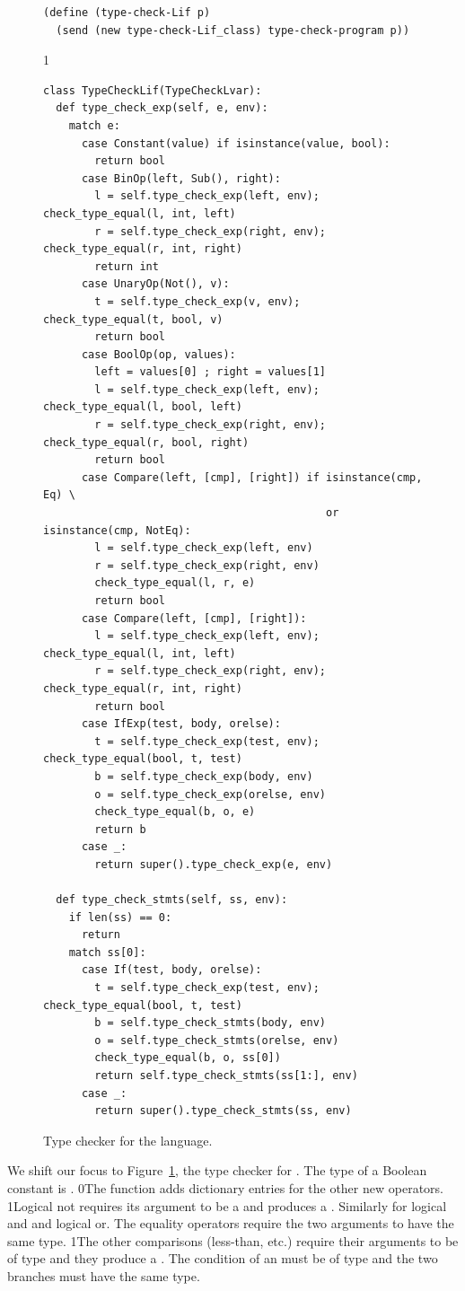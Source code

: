 \documentclass[7x10,nocrop]{TimesAPriori_MIT}%
\def\racketEd{0}
\def\pythonEd{1}
\def\edition{1}
\newcommand{\racket}[1]{{\if\edition\racketEd{#1}\fi}}
\newcommand{\python}[1]{{\if\edition\pythonEd #1\fi}}
\begin{document}
\begin{figure}[tbp]
{\begin{lstlisting}[basicstyle=\ttfamily\footnotesize]
(define (type-check-Lif p)
  (send (new type-check-Lif_class) type-check-program p))
\end{lstlisting}
\fi}
{\if\edition\pythonEd
\begin{lstlisting}
class TypeCheckLif(TypeCheckLvar):
  def type_check_exp(self, e, env):
    match e:
      case Constant(value) if isinstance(value, bool):
        return bool
      case BinOp(left, Sub(), right):
        l = self.type_check_exp(left, env); check_type_equal(l, int, left)
        r = self.type_check_exp(right, env); check_type_equal(r, int, right)
        return int
      case UnaryOp(Not(), v):
        t = self.type_check_exp(v, env); check_type_equal(t, bool, v)
        return bool 
      case BoolOp(op, values):
        left = values[0] ; right = values[1]
        l = self.type_check_exp(left, env); check_type_equal(l, bool, left)
        r = self.type_check_exp(right, env); check_type_equal(r, bool, right)
        return bool
      case Compare(left, [cmp], [right]) if isinstance(cmp, Eq) \
                                            or isinstance(cmp, NotEq):
        l = self.type_check_exp(left, env)
        r = self.type_check_exp(right, env)
        check_type_equal(l, r, e)
        return bool
      case Compare(left, [cmp], [right]):
        l = self.type_check_exp(left, env); check_type_equal(l, int, left)
        r = self.type_check_exp(right, env); check_type_equal(r, int, right)
        return bool
      case IfExp(test, body, orelse):
        t = self.type_check_exp(test, env); check_type_equal(bool, t, test)
        b = self.type_check_exp(body, env)
        o = self.type_check_exp(orelse, env)
        check_type_equal(b, o, e)
        return b
      case _:
        return super().type_check_exp(e, env)

  def type_check_stmts(self, ss, env):
    if len(ss) == 0:
      return
    match ss[0]:
      case If(test, body, orelse):
        t = self.type_check_exp(test, env); check_type_equal(bool, t, test)
        b = self.type_check_stmts(body, env)
        o = self.type_check_stmts(orelse, env)
        check_type_equal(b, o, ss[0])
        return self.type_check_stmts(ss[1:], env)
      case _:
        return super().type_check_stmts(ss, env)
\end{lstlisting}
\fi}
\caption{Type checker for the \LangIf{} language.}
\label{fig:type-check-Lif}
\end{figure}

We shift our focus to Figure~\ref{fig:type-check-Lif}, the type
checker for \LangIf{}.
%
The type of a Boolean constant is \BOOLTY{}.
%
\racket{The  function adds dictionary entries for
  the other new operators.}
%
\python{Logical not requires its argument to be a \BOOLTY{} and
  produces a \BOOLTY{}. Similarly for logical and and logical or. }
%
The equality operators require the two arguments to have the same
type.
%
\python{The other comparisons (less-than, etc.) require their
arguments to be of type \INTTY{} and they produce a \BOOLTY{}.}
%
The condition of an  must
be of \BOOLTY{} type and the two branches must have the same type.
\end{document}
